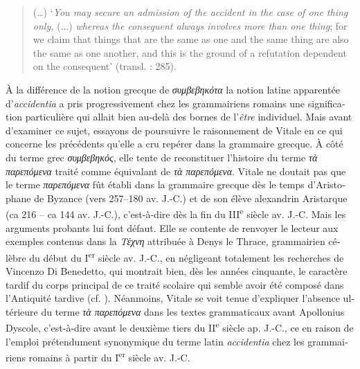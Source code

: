 \documentclass[output=paper]{langsci/langscibook}
\begin{document}
\begin{otherlanguage}{french}
\begin{quote}
(…) `\textit{You may secure an admission of the accident in the case of one thing only,} (...) \textit{whereas the consequent always involves more than one thing}; for we claim that things that are the same as one and the same thing are also the same as one another, and this is the ground of a refutation dependent on the consequent' (transl. \citealt{barnes_complete_1984} : 285).

\end{quote}

À la différence de la notion grecque de \textit{συμβεβηκότα} la notion latine apparentée d’\textit{accidentia} a pris progressivement chez les grammairiens romains une signification particulière qui allait bien au-delà des bornes de l’\textit{être} individuel. Mais avant d’examiner ce sujet, essayons de poursuivre le raisonnement de Vitale en ce qui concerne les précédents qu’elle a cru repérer dans la grammaire grecque. À côté du terme grec \textit{συμβεβηκός}, elle tente de reconstituer l’histoire du terme \textit{τὰ παρεπόμενα} traité comme équivalant de \textit{τὰ παρεπόμενα}. Vitale ne doutait pas que le terme \textit{παρεπόμενα} fût établi dans la grammaire grecque dès le temps d’Aristophane de Byzance (vers 257–180 av. J.-C.) et de son élève alexandrin Aristarque (ca 216 – ca 144 av. J.-C.), c’est-à-dire dès la fin du III\textsuperscript{e} siècle av. J.-C. Mais les arguments probants lui font défaut. Elle se contente de renvoyer le lecteur aux exemples contenus dans la \textit{Τέχνη} attribuée à Denys le Thrace, grammairien célèbre du début du I\textsuperscript{er} siècle av. J.-C., en négligeant totalement les recherches de Vincenzo Di Benedetto, qui montrait bien, dès les années cinquante, le caractère tardif du corps principal de ce traité scolaire qui semble avoir été composé dans l’Antiquité tardive (cf. \citealt{di_benedetto_dionisio_1958,di_benedetto_dionisio_1959}). Néanmoins, Vitale se voit tenue d’expliquer l’absence ultérieure du terme \textit{τὰ παρεπόμενα} dans les textes grammaticaux avant Apollonius Dyscole, c’est-à-dire avant le deuxième tiers du II\textsuperscript{e} siècle ap. J.-C., ce en raison de l’emploi prétendument synonymique du terme latin \textit{accidentia} chez les grammairiens romains à partir du I\textsuperscript{e}\textsuperscript{r} siècle av. J.-C.


\end{otherlanguage}
\end{document}
